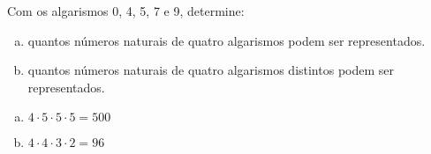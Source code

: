 \begin{ex}
Com os algarismos 0, 4, 5, 7 e 9, determine:
   \begin{enumerate}[(a)]
   \item  quantos números naturais de quatro algarismos podem ser representados.
   \item  quantos números naturais de quatro algarismos distintos podem ser representados.
   \end{enumerate}
    \begin{sol}
      \phantom{A}
        \begin{enumerate} [(a)]
            \item $4\cdot5\cdot5\cdot5=500$
            \item $4\cdot4\cdot3\cdot2=96$
        \end{enumerate}
    \end{sol}
\end{ex}